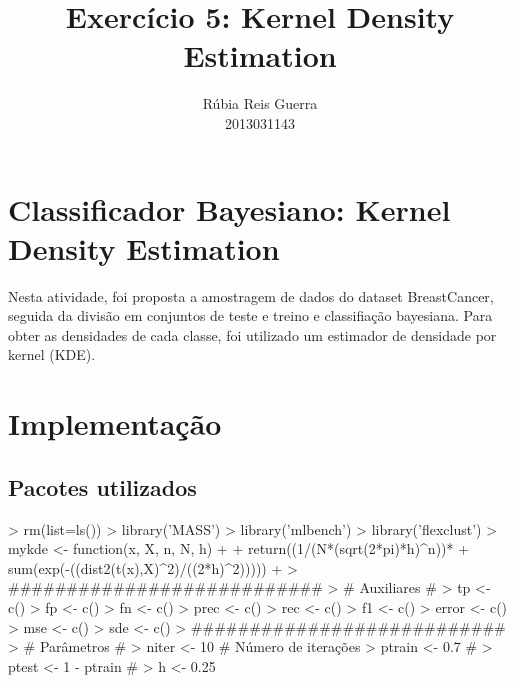 \documentclass{article}
\title{Exercício 5: Kernel Density Estimation}
\author{Rúbia Reis Guerra \\ 2013031143}
\begin{document}

\maketitle

\section{Classificador Bayesiano: Kernel Density Estimation}
Nesta atividade, foi proposta a amostragem de dados do dataset BreastCancer, seguida da divisão em conjuntos de teste e treino e classifiação bayesiana. Para obter as densidades de cada classe, foi utilizado um estimador de densidade por kernel (KDE).

\section{Implementação}
\subsection{Pacotes utilizados}
\begin{Schunk}
\begin{Sinput}
> rm(list=ls())
> library('MASS')
> library('mlbench')
> library('flexclust')
> mykde <- function(x, X, n, N, h)
+ {
+   return((1/(N*(sqrt(2*pi)*h)^n))*
+       sum(exp(-((dist2(t(x),X)^2)/((2*h)^2)))))
+ }
> ###########################
> # Auxiliares #
> tp <- c()
> fp <- c()
> fn <- c()
> prec <- c()
> rec <- c()
> f1 <- c()
> error <- c()
> mse <- c()
> sde <- c()
> ###########################
> # Parâmetros #
> niter <- 10 # Número de iterações
> ptrain <- 0.7 # % conjunto de treino
> ptest <- 1 - ptrain # % conjunto de teste
> h <- 0.25
\end{Sinput}
\end{Schunk}
\end{document}
